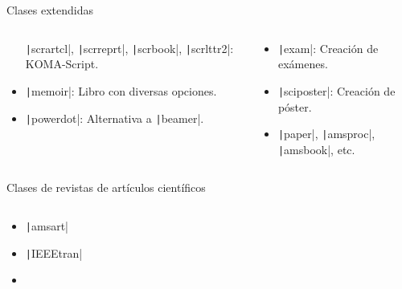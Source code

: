 \begin{frame}
\begin{block}{Clases extendidas}
\begin{columns}
\begin{column}{.52\paperwidth}
\begin{itemize}
					      \texttt|scrartcl|,
					      \texttt|scrreprt|,
					      \texttt|scrbook|,
					      \texttt|scrlttr2|: KOMA-Script.

					\item

					      \texttt|memoir|: Libro con diversas opciones.

					\item

					      \texttt|powerdot|: Alternativa a
					      \texttt|beamer|.
				\end{itemize}
			\end{column}
			\begin{column}{.44\paperwidth}
				\begin{itemize}
					\item

					      \texttt|exam|: Creación de exámenes.

					\item

					      \texttt|sciposter|:
					      Creación de póster.

					\item

					      \texttt|paper|,
					      \texttt|amsproc|,
					      \texttt|amsbook|,
					      etc.
				\end{itemize}
			\end{column}
		\end{columns}
	\end{block}

	\pause

	\begin{block}{Clases de revistas de artículos científicos}
		\vspace*{-.5\baselineskip}\setlength\belowdisplayshortskip{0pt}
		\begin{columns}
			\begin{column}{.3\paperwidth}
				\begin{itemize}
					\item

					      \texttt|amsart|

					\item

					      \texttt|IEEEtran|


					\item


\end{itemize}
\end{column}
\end{columns}
\end{block}
\end{frame}
